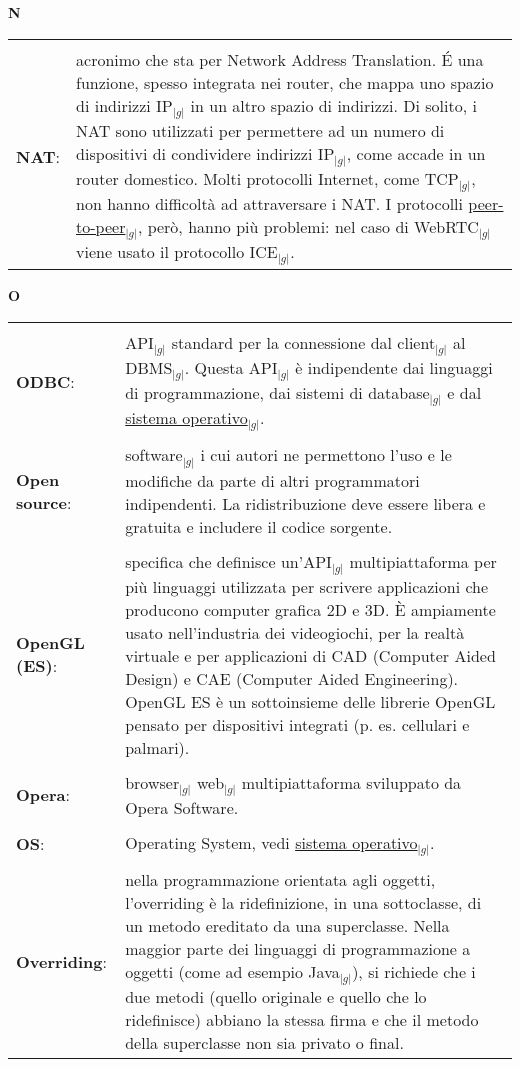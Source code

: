 \hfill\Huge{\textbf{N}}\\
\normalsize
	\begin{longtable}{p{} p{}} 
	    \toprule
	    \\
	    \textbf{NAT}:	&	acronimo che sta per Network Address Translation. \'E una funzione, spesso integrata nei router, che mappa uno spazio di indirizzi IP$_{|g|}$ in un altro spazio di indirizzi. Di solito, i NAT sono utilizzati per permettere ad un numero di dispositivi di condividere indirizzi IP$_{|g|}$, come accade in un router domestico. 
					Molti protocolli Internet, come TCP$_{|g|}$, non hanno difficoltà ad attraversare i NAT. I protocolli \underline{peer-to-peer}$_{|g|}$, però, hanno più problemi: nel caso di WebRTC$_{|g|}$ viene usato il protocollo ICE$_{|g|}$.\\
	\end{longtable}
\newpage

\hfill\Huge{\textbf{O}}\\
\normalsize
	\begin{longtable}{p{} p{}} 
	    \toprule
	    \\
	    \textbf{ODBC}:  		&	API$_{|g|}$ standard per la connessione dal client$_{|g|}$ al DBMS$_{|g|}$. Questa API$_{|g|}$ è indipendente dai linguaggi di programmazione, dai sistemi di database$_{|g|}$ e dal \underline{sistema operativo}$_{|g|}$.\\
	    \\
	    \textbf{Open source}:	&	software$_{|g|}$ i cui autori ne permettono l’uso e le modifiche da parte di altri programmatori indipendenti. La ridistribuzione deve essere libera e gratuita e includere il codice sorgente.\\
	    \\
	    \textbf{OpenGL (ES)}:	&	specifica che definisce un’API$_{|g|}$ multipiattaforma per più linguaggi utilizzata per scrivere applicazioni che producono computer grafica 2D e 3D. \`E ampiamente usato nell’industria dei videogiochi, 
						per la realtà virtuale e per applicazioni di CAD (Computer Aided Design) e CAE (Computer Aided Engineering).\newline
						OpenGL ES è un sottoinsieme delle librerie OpenGL pensato per dispositivi integrati (p. es. cellulari e palmari).\\
	    \\
	    \textbf{Opera}:		&	browser$_{|g|}$ web$_{|g|}$ multipiattaforma sviluppato da Opera Software.\\
	    \\
	    \textbf{OS}:		&	Operating System, vedi \underline{sistema operativo}$_{|g|}$.\\
	    \\
	    \textbf{Overriding}: 	&	nella programmazione orientata agli oggetti, l'overriding è la ridefinizione, in una sottoclasse, di un metodo ereditato da una superclasse. Nella maggior parte dei linguaggi di programmazione a oggetti (come ad esempio Java$_{|g|}$), 
						si richiede che i due metodi (quello originale e quello che lo ridefinisce) abbiano la stessa firma e che il metodo della superclasse non sia privato o final.\\
	\end{longtable}
\newpage


